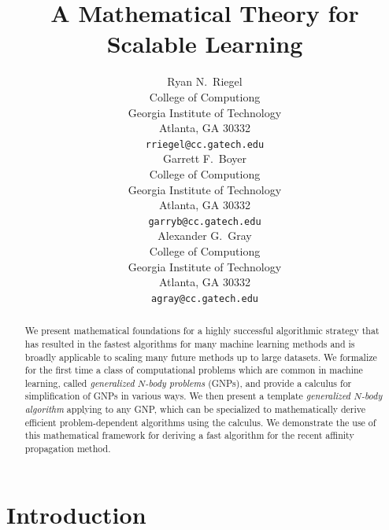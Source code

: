 \documentclass{article}
\title{A Mathematical Theory for Scalable Learning}
\author{
Ryan N.~Riegel \\
College of Computiong \\
Georgia Institute of Technology \\
Atlanta, GA 30332 \\
\texttt{rriegel@cc.gatech.edu} \\
\And
Garrett F.~Boyer \\
College of Computiong \\
Georgia Institute of Technology \\
Atlanta, GA 30332 \\
\texttt{garryb@cc.gatech.edu} \\
\And
Alexander G.~Gray \\
College of Computiong \\
Georgia Institute of Technology \\
Atlanta, GA 30332 \\
\texttt{agray@cc.gatech.edu} \\
}
\newcommand{\killspace}{\vspace{-0.08in}}
\newcommand{\mysection}[1]{\vspace{-0.04in}\section{#1}\killspace}
\begin{document}
\makeanontitle

\begin{abstract}
We present mathematical foundations for a highly successful
algorithmic strategy that has resulted in the fastest algorithms for
many machine learning methods and is broadly applicable to scaling
many future methods up to large datasets.  We formalize for the first
time a class of computational problems which are common in machine
learning, called {\em generalized $N$-body problems} (GNPs), and
provide a calculus for simplification of GNPs in various ways.  We
then present a template {\em generalized $N$-body algorithm} applying
to any GNP, which can be specialized to mathematically derive
efficient problem-dependent algorithms using the calculus.  We
demonstrate the use of this mathematical framework for deriving a fast
algorithm for the recent affinity propagation method.
\end{abstract}

\mysection{Introduction}
\end{document}
